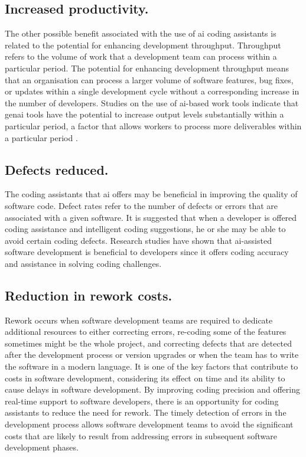 \subsection {Increased productivity.}
\label{sec:Increased productivity}
The other possible benefit associated with the use of \gls{ai} coding assistants is related to the potential for enhancing development throughput. Throughput refers to the volume of work that a development team can process within a particular period. The potential for enhancing development throughput means that an organisation can process a larger volume of software features, bug fixes, or updates within a single development cycle without a corresponding increase in the number of developers. Studies on the use of \gls{ai}-based work tools indicate that \gls{genai} tools have the potential to increase output levels substantially within a particular period, a factor that allows workers to process more deliverables within a particular period \autocite{Noy2023}.

\subsection {Defects reduced.}
\label{sec:Defects reduced}
The coding assistants that \gls{ai} offers may be beneficial in improving the quality of software code. Defect rates refer to the number of defects or errors that are associated with a given software. It is suggested that when a developer is offered coding assistance and intelligent coding suggestions, he or she may be able to avoid certain coding defects. Research studies have shown that \gls{ai}-assisted software development is beneficial to developers since it offers coding accuracy and assistance in solving coding challenges\autocite{Peng2023}.

\subsection {Reduction in rework costs.}
\label{sec:Reduction in rework costs}
Rework occurs when software development teams are required to dedicate additional resources to either correcting errors, re-coding some of the features sometimes might be the whole project, and correcting defects that are detected after the development process or version upgrades or when the team has to write the software in a modern language. It is one of the key factors that contribute to costs in software development, considering its effect on time and its ability to cause delays in software development. By improving coding precision and offering real-time support to software developers, there is an opportunity for coding assistants to reduce the need for rework. The timely detection of errors in the development process allows software development teams to avoid the significant costs that are likely to result from addressing errors in subsequent software development phases.

